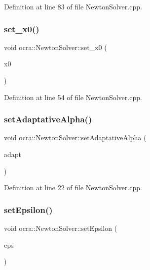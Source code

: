 Definition at line 83 of file Newton\+Solver.\+cpp.

\hypertarget{classocra_1_1NewtonSolver_a4fc7eba127f6975a0e8947f39d24629a}{}\label{classocra_1_1NewtonSolver_a4fc7eba127f6975a0e8947f39d24629a} 
\subsubsection{\texorpdfstring{set\+\_\+x0()}{set\_x0()}}
{\footnotesize\ttfamily void ocra\+::\+Newton\+Solver\+::set\+\_\+x0 (\begin{DoxyParamCaption}\item[{const Vector\+Xd \&}]{x0 }\end{DoxyParamCaption})}



Definition at line 54 of file Newton\+Solver.\+cpp.

\hypertarget{classocra_1_1NewtonSolver_ade438475c7a8ffdc2bb60097639b8e27}{}\label{classocra_1_1NewtonSolver_ade438475c7a8ffdc2bb60097639b8e27} 
\subsubsection{\texorpdfstring{set\+Adaptative\+Alpha()}{setAdaptativeAlpha()}}
{\footnotesize\ttfamily void ocra\+::\+Newton\+Solver\+::set\+Adaptative\+Alpha (\begin{DoxyParamCaption}\item[{bool}]{adapt }\end{DoxyParamCaption})}



Definition at line 22 of file Newton\+Solver.\+cpp.

\hypertarget{classocra_1_1NewtonSolver_ac128bd9e9d7c05ae3e91bddb362e7165}{}\label{classocra_1_1NewtonSolver_ac128bd9e9d7c05ae3e91bddb362e7165} 
\subsubsection{\texorpdfstring{set\+Epsilon()}{setEpsilon()}}
{\footnotesize\ttfamily void ocra\+::\+Newton\+Solver\+::set\+Epsilon (\begin{DoxyParamCaption}\item[{double}]{eps }\end{DoxyParamCaption})}



